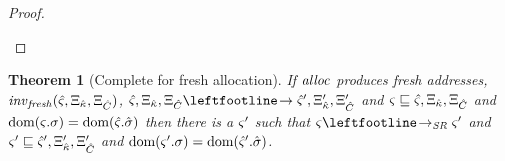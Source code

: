 \documentclass{article}
\newtheorem{theorem}{Theorem}
\begin{document}
\begin{proof}
\begin{byCases}
  \end{byCases}
\end{proof}

\begin{theorem}[Complete for fresh allocation]
  If $\mathit{alloc}$ produces fresh addresses, $\mathit{inv}_{\mathit{fresh}}(\hat\varsigma,\Xi_{\hat{\kappa}},\Xi_{\hat{C}})$, $\mastate,\mktab_\makont,\mktab_\mamkont \stepto \mastate',\mktab_\makont',\mktab'_\mamkont$ and
  $\varsigma\sqsubseteq \hat\varsigma,\Xi_{\hat{\kappa}},\Xi_{\hat{C}}$ and $\text{dom}(\varsigma.\sigma) = \text{dom}(\hat\varsigma.{\hat\sigma})$ then there is a $\varsigma'$ such that
  $\mstate \stepto_\SR \mstate'$ and $\varsigma' \sqsubseteq\hat\varsigma',\Xi_{\hat{\kappa}}',\Xi'_{\hat{C}}$ and $\text{dom}(\varsigma'.\sigma) = \text{dom}(\hat\varsigma'.{\hat\sigma})$.
\end{theorem}
\end{document}
